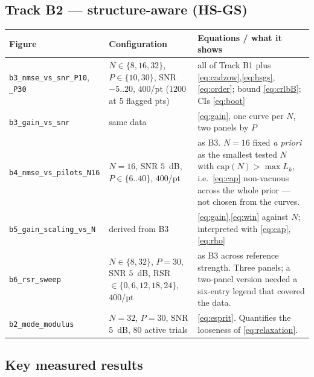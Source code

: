 \documentclass[11pt,a4paper]{article}
\begin{document}
\subsection{Track B2 --- structure-aware (HS-GS)}

\begin{longtable}{@{}p{}p{}p{}@{}}
\toprule
\textbf{Figure} & \textbf{Configuration} & \textbf{Equations / what it shows}\\
\midrule
\endhead
\texttt{b3\_nmse\_vs\_}\newline\texttt{snr\_P10}, \texttt{\_P30}
& $N\in\{8,16,32\}$, $P\in\{10,30\}$, SNR $-5..20$, $400$/pt ($1200$ at 5 flagged pts)
& all of Track B1 plus \eqref{eq:cadzow},\eqref{eq:hsgs},\eqref{eq:order}; bound \eqref{eq:crlbB}; CIs \eqref{eq:boot}\\
\addlinespace
\texttt{b3\_gain\_vs\_snr}
& same data
& \eqref{eq:gain}, one curve per $N$, two panels by $P$\\
\addlinespace
\texttt{b4\_nmse\_vs\_}\newline\texttt{pilots\_N16}
& $N=16$, SNR $5$~dB, $P\in\{6..40\}$, $400$/pt
& as B3. $N=16$ fixed \emph{a priori} as the smallest tested $N$ with $\mathrm{cap}(N)>\max L_k$, i.e.\ \eqref{eq:cap} non-vacuous across the whole prior --- not chosen from the curves.\\
\addlinespace
\texttt{b5\_gain\_}\newline\texttt{scaling\_vs\_N}
& derived from B3
& \eqref{eq:gain},\eqref{eq:win} against $N$; interpreted with \eqref{eq:cap},\eqref{eq:rho}\\
\addlinespace
\texttt{b6\_rsr\_sweep}
& $N\in\{8,32\}$, $P=30$, SNR $5$~dB, RSR $\in\{0,6,12,18,24\}$, $400$/pt
& as B3 across reference strength. Three panels; a two-panel version needed a six-entry legend that covered the data.\\
\addlinespace
\texttt{b2\_mode\_modulus}
& $N=32$, $P=30$, SNR $5$~dB, $80$ active trials
& \eqref{eq:esprit}. Quantifies the looseness of \eqref{eq:relaxation}.\\
\bottomrule
\end{longtable}

\subsection{Key measured results}
\end{document}
